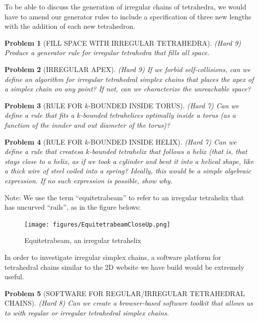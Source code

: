 \documentclass[11pt]{article}
\newtheorem{problem}{Problem}
\begin{document}
To be able to discuss the generation of irregular chains of tetrahedra, we would have to amend our generator rules to include a specification
of three new lengths with the addition of each new tetrahedron.

\begin{problem}[FILL SPACE WITH IRREGULAR TETRAHEDRA]
(Hard 9) Produce a generator rule for irregular tetrahedra that fills all space.
\end{problem}

\begin{problem}[IRREGULAR APEX]
  (Hard 9) If we forbid self-collisions, can we define an algorithm for irregular tetrahedral simplex chains that places the apex
  of a simplex chain on any point? If not, can we characterize the unreachable space?
\end{problem}

\begin{problem}[RULE FOR $k$-BOUNDED INSIDE TORUS]
(Hard 7) Can we define a rule that fits a $k$-bounded tetrahelices optimally inside a torus (as a function of the innder and out diameter of the torus)?  
\end{problem}

\begin{problem}[RULE FOR $k$-BOUNDED INSIDE HELIX]
\item (Hard 7) Can we define a rule that createsa $k$-bounded tetrahelix that follows a helix (that is, that stays close to a helix, as if we took a cylinder and bent it into a helical shape, like a thick wire of
steel coiled into a spring? Ideally, this would be a simple algebraic expression. If no such expression is possible, show why.
\end{problem}

Note: We use the term ``equitetrabeam'' to refer to an irregular tetrahelix that has uncurved ``rails'', as in the figure belows:

\begin{figure}
     \centering
     \texttt{[image: figures/EquitetrabeamCloseUp.png]}
     \caption{Equitetrabeam, an irregular tetrahelix}
  \label{fig:equitetrabeam}
\end{figure}

In order to investigate irregular simplex chains, a software platform for tetrahedral chains similar to the 2D website we have build would be
extremely useful.

\begin{problem}[SOFTWARE FOR REGULAR/IRREGULAR TETRAHEDRAL CHAINS]
(Hard 8) Can we create a browser-based software toolkit that allows us to with regular or irregular tetrahedral simplex chains.  
\end{problem}
\end{document}
